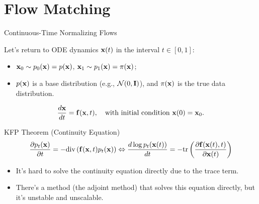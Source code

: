 \documentclass{beamer}
\begin{document}
\section{Flow Matching}
\begin{frame}{Continuous-Time Normalizing Flows}

	Let's return to ODE dynamics $\mathbf{x}(t)$ in the interval $t \in [0, 1]$:
	\begin{itemize}
		\item $\mathbf{x}_0 \sim p_0(\mathbf{x}) = p(\mathbf{x})$, $\mathbf{x}_1 \sim p_1(\mathbf{x}) =  \pi(\mathbf{x})$;
		\item $p(\mathbf{x})$ is a base distribution (e.g., $\mathcal{N}(0, \mathbf{I})$), and $\pi(\mathbf{x})$ is the true data distribution.
	\end{itemize}
	\[
		\frac{d \mathbf{x}}{dt} = \mathbf{f} (\mathbf{x}, t),  \quad \text{with initial condition } \mathbf{x}(0) = \mathbf{x}_0.
	\]
    \eqpause
	\vspace{-0.3cm}
	\begin{block}{KFP Theorem (Continuity Equation)}
		\vspace{-0.5cm}
		\[
			\frac{\partial p_t(\mathbf{x})}{\partial t} = - \text{div}\left(\mathbf{f}(\mathbf{x}, t) p_t(\mathbf{x})\right) \Leftrightarrow \frac{d \log p_t(\mathbf{x}(t))}{d t} = - \text{tr} \left( \frac{\partial \mathbf{f}(\mathbf{x}(t), t)}{\partial \mathbf{x}(t)} \right)
		\]
		\vspace{-0.3cm}
	\end{block}
    \eqpause
	\begin{itemize}
		\item It's hard to solve the continuity equation directly due to the trace term.
		\item There's a method (the adjoint method) that solves this equation directly, but it's unstable and unscalable.
	\end{itemize}
\end{frame}
\end{document}
